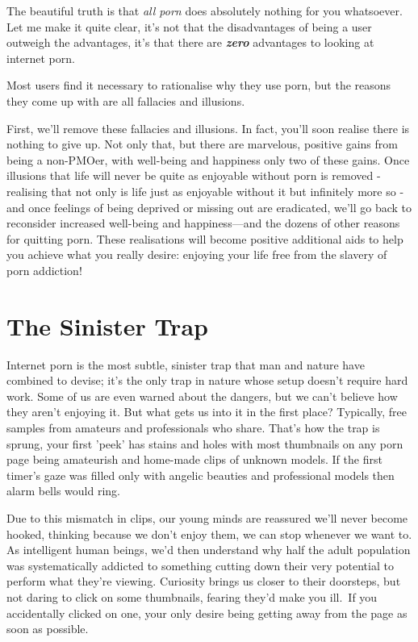 \documentclass[
]{book}
\begin{document}
The beautiful truth is that \emph{all porn} does absolutely nothing for you whatsoever. Let me make it quite clear, it's not that the disadvantages of being a user outweigh the advantages, it's that there are \textbf{\emph{zero}} advantages to looking at internet porn.

Most users find it necessary to rationalise why they use porn, but the reasons they come up with are all fallacies and illusions.

First, we'll remove these fallacies and illusions. In fact, you'll soon realise there is nothing to give up. Not only that, but there are marvelous, positive gains from being a non-PMOer, with well-being and happiness only two of these gains. Once illusions that life will never be quite as enjoyable without porn is removed - realising that not only is life just as enjoyable without it but infinitely more so - and once feelings of being deprived or missing out are eradicated, we'll go back to reconsider increased well-being and happiness---and the dozens of other reasons for quitting porn. These realisations will become positive additional aids to help you achieve what you really desire: enjoying your life free from the slavery of porn addiction!

\hypertarget{the-sinister-trap}{%
\section{The Sinister Trap}\label{the-sinister-trap}}

Internet porn is the most subtle, sinister trap that man and nature have combined to devise; it's the only trap in nature whose setup doesn't require hard work. Some of us are even warned about the dangers, but we can't believe how they aren't enjoying it. But what gets us into it in the first place? Typically, free samples from amateurs and professionals who share. That's how the trap is sprung, your first 'peek' has stains and holes with most thumbnails on any porn page being amateurish and home-made clips of unknown models. If the first timer's gaze was filled only with angelic beauties and professional models then alarm bells would ring.

Due to this mismatch in clips, our young minds are reassured we'll never become hooked, thinking because we don't enjoy them, we can stop whenever we want to. As intelligent human beings, we'd then understand why half the adult population was systematically addicted to something cutting down their very potential to perform what they're viewing. Curiosity brings us closer to their doorsteps, but not daring to click on some thumbnails, fearing they'd make you ill.~If you accidentally clicked on one, your only desire being getting away from the page as soon as possible.
\end{document}
